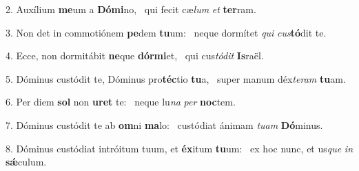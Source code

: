 2. Auxílium \textbf{me}um a \textbf{Dó}\textbf{mi}no, \ast\  qui fecit cæ\textit{lum} \textit{et} \textbf{ter}ram.\

3. Non det in commotiónem \textbf{pe}dem \textbf{tu}um: \ast\  neque dormítet \textit{qui} \textit{cus}\textbf{tó}dit te.\

4. Ecce, non dormitábit \textbf{ne}que \textbf{dór}\textbf{mi}et, \ast\  qui cus\textit{tó}\textit{dit} \textbf{Is}raël.\

5. Dóminus custódit te, Dóminus pro\textbf{téc}tio \textbf{tu}a, \ast\  super manum déx\textit{te}\textit{ram} \textbf{tu}am.\

6. Per diem \textbf{sol} non \textbf{u}\textbf{ret} te: \ast\  neque lu\textit{na} \textit{per} \textbf{noc}tem.\

7. Dóminus custódit te ab \textbf{om}ni \textbf{ma}lo: \ast\  custódiat ánimam \textit{tu}\textit{am} \textbf{Dó}minus.\

8. Dóminus custódiat intróitum tuum, et \textbf{éx}itum \textbf{tu}um: \ast\  ex hoc nunc, et us\textit{que} \textit{in} \textbf{sǽ}culum.\

